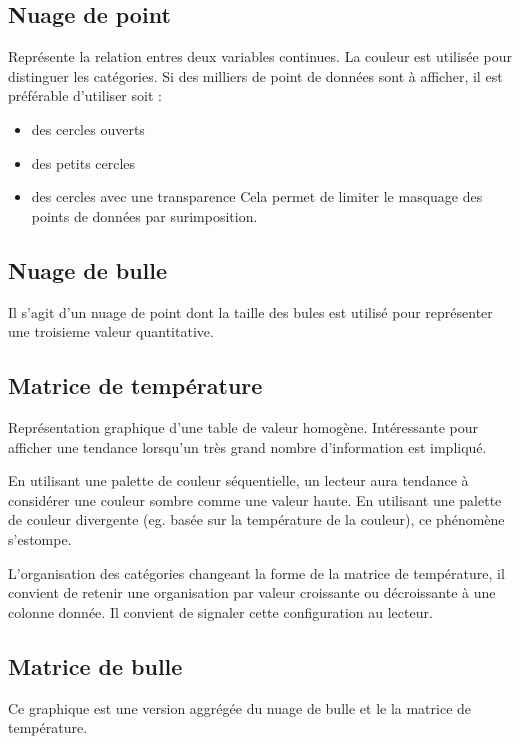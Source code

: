 \documentclass[a4paper,12pt]{article}
\begin{document}
\begin{multicols}{2}
\subsection*{Nuage de point}
\label{sec:org59b9d02}
Représente la relation entres deux variables continues. \autocite{alansmithLexiqueVisuel}
La couleur est utilisée pour distinguer les catégories.
Si des milliers de point de données sont à afficher, il est préférable d'utiliser soit :
\begin{itemize}
\item des cercles ouverts
\item des petits cercles
\item des cercles avec une transparence
Cela permet de limiter le masquage des points de données par surimposition. \autocite{andreaskrauseBestPracticesData2024}
\end{itemize}
\subsection*{Nuage de bulle}
\label{sec:org8b78838}
Il s'agit d'un nuage de point dont la taille des bules est utilisé pour représenter une troisieme valeur quantitative. \autocite{alansmithLexiqueVisuel}
\subsection*{Matrice de température}
\label{sec:org21bf6d6}
Représentation graphique d'une table de valeur homogène. \autocite{sosulskiGraphics2019}
Intéressante pour afficher une tendance lorsqu'un très grand nombre d'information est impliqué.

En utilisant une palette de couleur séquentielle, un lecteur aura tendance à considérer une couleur sombre comme une valeur haute. En utilisant une palette de couleur divergente (eg. basée sur la température de la couleur), ce phénomène s'estompe.

L'organisation des catégories changeant la forme de la matrice de température, il convient de retenir une organisation par valeur croissante ou décroissante à une colonne donnée. Il convient de signaler cette configuration au lecteur. \autocite{wilkeVisualizingAmounts2019}
\subsection*{Matrice de bulle}
\label{sec:org6726e2f}
Ce graphique est une version aggrégée du nuage de bulle et le la matrice de température.


\end{multicols}
\end{document}
